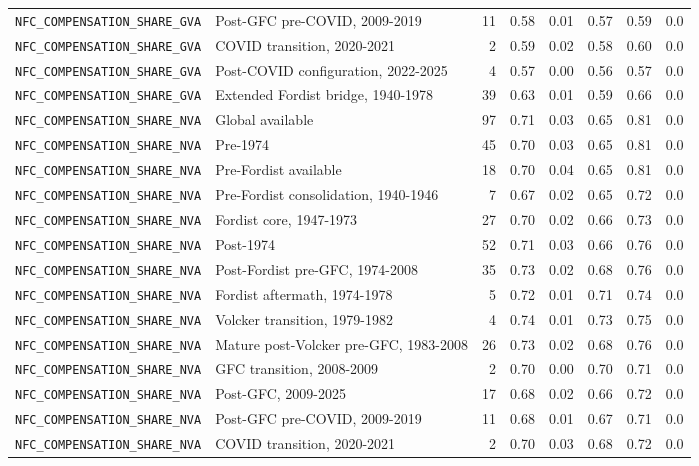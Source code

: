 \begin{landscape}
\begin{longtable}{p{4.4cm}p{3.8cm}rrrrrr}
\nolinkurl{NFC_COMPENSATION_SHARE_GVA} & Post-GFC pre-COVID, 2009-2019 & 11 & 0.58 & 0.01 & 0.57 & 0.59 & 0.0
\\
\nolinkurl{NFC_COMPENSATION_SHARE_GVA} & COVID transition, 2020-2021 & 2 & 0.59 & 0.02 & 0.58 & 0.60 & 0.0
\\
\nolinkurl{NFC_COMPENSATION_SHARE_GVA} & Post-COVID configuration, 2022-2025 & 4 & 0.57 & 0.00 & 0.56 & 0.57 & 0.0
\\
\nolinkurl{NFC_COMPENSATION_SHARE_GVA} & Extended Fordist bridge, 1940-1978 & 39 & 0.63 & 0.01 & 0.59 & 0.66 & 0.0
\\
\nolinkurl{NFC_COMPENSATION_SHARE_NVA} & Global available & 97 & 0.71 & 0.03 & 0.65 & 0.81 & 0.0
\\
\nolinkurl{NFC_COMPENSATION_SHARE_NVA} & Pre-1974 & 45 & 0.70 & 0.03 & 0.65 & 0.81 & 0.0
\\
\nolinkurl{NFC_COMPENSATION_SHARE_NVA} & Pre-Fordist available & 18 & 0.70 & 0.04 & 0.65 & 0.81 & 0.0
\\
\nolinkurl{NFC_COMPENSATION_SHARE_NVA} & Pre-Fordist consolidation, 1940-1946 & 7 & 0.67 & 0.02 & 0.65 & 0.72 & 0.0
\\
\nolinkurl{NFC_COMPENSATION_SHARE_NVA} & Fordist core, 1947-1973 & 27 & 0.70 & 0.02 & 0.66 & 0.73 & 0.0
\\
\nolinkurl{NFC_COMPENSATION_SHARE_NVA} & Post-1974 & 52 & 0.71 & 0.03 & 0.66 & 0.76 & 0.0
\\
\nolinkurl{NFC_COMPENSATION_SHARE_NVA} & Post-Fordist pre-GFC, 1974-2008 & 35 & 0.73 & 0.02 & 0.68 & 0.76 & 0.0
\\
\nolinkurl{NFC_COMPENSATION_SHARE_NVA} & Fordist aftermath, 1974-1978 & 5 & 0.72 & 0.01 & 0.71 & 0.74 & 0.0
\\
\nolinkurl{NFC_COMPENSATION_SHARE_NVA} & Volcker transition, 1979-1982 & 4 & 0.74 & 0.01 & 0.73 & 0.75 & 0.0
\\
\nolinkurl{NFC_COMPENSATION_SHARE_NVA} & Mature post-Volcker pre-GFC, 1983-2008 & 26 & 0.73 & 0.02 & 0.68 & 0.76 & 0.0
\\
\nolinkurl{NFC_COMPENSATION_SHARE_NVA} & GFC transition, 2008-2009 & 2 & 0.70 & 0.00 & 0.70 & 0.71 & 0.0
\\
\nolinkurl{NFC_COMPENSATION_SHARE_NVA} & Post-GFC, 2009-2025 & 17 & 0.68 & 0.02 & 0.66 & 0.72 & 0.0
\\
\nolinkurl{NFC_COMPENSATION_SHARE_NVA} & Post-GFC pre-COVID, 2009-2019 & 11 & 0.68 & 0.01 & 0.67 & 0.71 & 0.0
\\
\nolinkurl{NFC_COMPENSATION_SHARE_NVA} & COVID transition, 2020-2021 & 2 & 0.70 & 0.03 & 0.68 & 0.72 & 0.0

\end{longtable}
\end{landscape}

